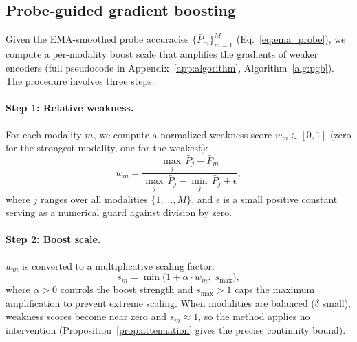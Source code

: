 \documentclass{article} %
\begin{document}
\subsection{Probe-guided gradient boosting}
\label{sec:boost}

Given the EMA-smoothed probe accuracies $\{\bar{P}_m\}_{m=1}^{M}$ (Eq.~\ref{eq:ema_probe}), we compute a per-modality boost scale that amplifies the gradients of weaker encoders (full pseudocode in Appendix~\ref{app:algorithm}, Algorithm~\ref{alg:pgb}). The procedure involves three steps.

\paragraph{Step 1: Relative weakness.}
For each modality $m$, we compute a normalized weakness score $w_m \in [0,1]$ (zero for the strongest modality, one for the weakest):
%
\begin{equation}
\label{eq:weakness}
w_m = \frac{\max_j\,\bar{P}_j - \bar{P}_m}{\max_j\,\bar{P}_j - \min_j\,\bar{P}_j + \epsilon},
\end{equation}
%
where $j$ ranges over all modalities $\{1, \ldots, M\}$, and $\epsilon$ is a small positive constant serving as a numerical guard against division by zero.

\paragraph{Step 2: Boost scale.}
$w_m$ is converted to a multiplicative scaling factor:
%
\begin{equation}
\label{eq:boost_scale}
s_m = \min\!\bigl(1 + \alpha \cdot w_m,\; s_{\max}\bigr),
\end{equation}
%
where $\alpha > 0$ controls the boost strength and $s_{\max} > 1$ caps the maximum amplification to prevent extreme scaling. When modalities are balanced ($\delta$ small), weakness scores become near zero and $s_m \approx 1$, so the method applies no intervention (Proposition~\ref{prop:attenuation} gives the precise continuity bound).
\end{document}
